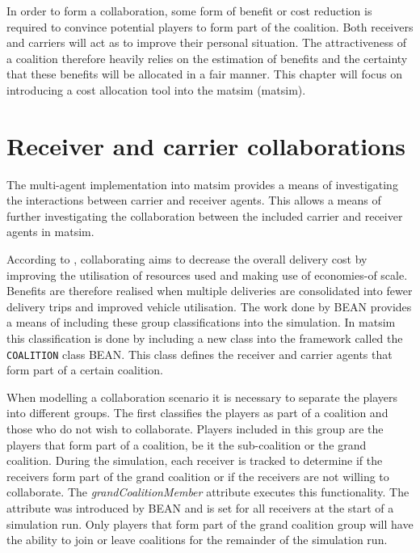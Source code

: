 \label{chapter4}
In order to form a collaboration, some form of benefit or cost reduction is required to convince potential players to form part of the coalition. Both receivers and carriers will act as to improve their personal situation. The attractiveness of a coalition therefore heavily relies on the estimation of benefits and the certainty that these benefits will be allocated in a fair manner. This chapter will focus on introducing a cost allocation tool into the \acrlong{matsim} (\acrshort{matsim}).

\section{Receiver and carrier collaborations}
The multi-agent implementation into \acrshort{matsim} provides a means of investigating the interactions between carrier and receiver agents. This allows a means of further investigating the collaboration between the included carrier and receiver agents in \acrshort{matsim}. 

According to \citet{quintero2017using}, collaborating aims to decrease the overall delivery cost by improving the utilisation of resources used and making use of economies-of scale. Benefits are therefore realised when multiple deliveries are consolidated into fewer delivery trips and improved vehicle utilisation.  The work done by BEAN provides a means of including these group classifications into the simulation. In \acrshort{matsim} this classification is done by including a new class into the framework called the \texttt{COALITION} class BEAN. This class defines the receiver and carrier agents that form part of a certain coalition.\par

When modelling a collaboration scenario it is necessary to separate the players into different groups. The first classifies the players as part of a coalition and those who do not wish to collaborate. Players included in this group are the players that form part of a coalition, be it the sub-coalition or the grand coalition. During the simulation, each receiver is tracked to determine if the receivers form part of the grand coalition or if the receivers are not willing to collaborate. The \textit{grandCoalitionMember} attribute executes this functionality. The attribute was introduced by BEAN and is set for all receivers at the start of a simulation run. Only players that form part of the grand coalition group will have the ability to join or leave coalitions for the remainder of the simulation run.\par

